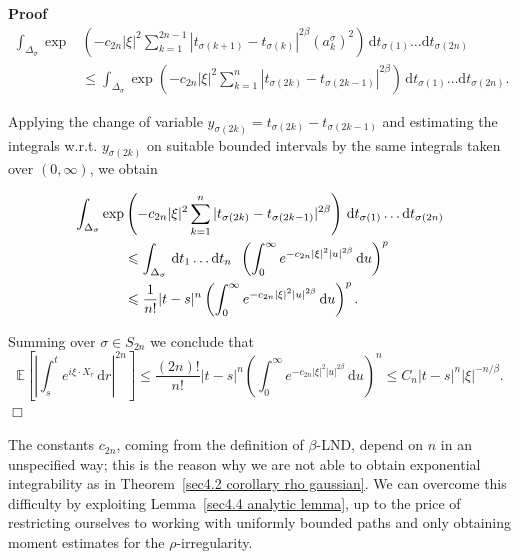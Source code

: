 \documentclass[10pt]{article}
\newcommand{\mathd}{\mathrm{d}}
\newenvironment{proof}{\noindent\textbf{Proof\ }}{\hspace*{\fill}$\Box$\medskip}
\begin{document}
\begin{proof}
  \begin{align}
    \int_{\Delta_{\sigma}} \exp & \left( - c_{2 n} | \xi |^2 \sum_{k = 1}^{2 n
    - 1} | t_{\sigma (k + 1)} - t_{\sigma (k)} |^{2 \beta} (a_k^{\sigma})^2
    \right) \, \mathd t_{\sigma (1)} \ldots \mathd t_{\sigma (2 n)}\\
    & \leqslant \int_{\Delta_{\sigma}} \exp \left( - c_{2 n} | \xi |^2
    \sum_{k = 1}^n | t_{\sigma (2 k)} - t_{\sigma (2 k - 1)} |^{2 \beta}
    \right) \, \mathd t_{\sigma (1)} \ldots \mathd t_{\sigma (2 n)} .
  \end{align}
  
  Applying the change of variable $y_{\sigma (2 k)} = t_{\sigma (2 k)} -
  t_{\sigma (2 k - 1)}$ and estimating the integrals w.r.t. $y_{\sigma (2 k)}$
  on suitable bounded intervals by the same integrals taken over $(0,
  \infty)$, we obtain
  
  \begin{align}
    \int_{\Delta_{\sigma}} \exp & \left( - c_{2 n} | \xi |^2 \sum_{k = 1}^n |
    t_{\sigma (2 k)} - t_{\sigma (2 k - 1)} |^{2 \beta} \right) \, \mathd
    t_{\sigma (1)} \ldots \mathd t_{\sigma (2 n)}\\
    & \leqslant \int_{\Delta_{\sigma}} \, \mathd t_1 \ldots \mathd t_n
    \hspace{0.5em} \left( \int_0^{\infty} e^{- c_{2 n} | \xi |^2 | u |^{2
    \beta}} \, \mathd u \right)^p\\
    & \leqslant \frac{1}{n!} | t - s |^n \left( \int_0^{\infty} e^{- c_{2 n}
    | \xi |^2 | u |^{2 \beta}} \, \mathd u \right)^p .
  \end{align}
  
  Summing over $\sigma \in S_{2 n}$ we conclude that
  \[ \mathbb{E} \left[ \left| \int_s^t e^{i \xi \cdot X_r} \, \mathd r
     \right|^{2 n} \right] \leqslant \frac{(2 n) !}{n!}  | t - s |^n \left(
     \int_0^{\infty} e^{- c_{2 n} | \xi |^2 | u |^{2 \beta}} \, \mathd u
     \right)^n \leqslant C_n | t - s |^n  | \xi |^{- n / \beta} . \]
\end{proof}

\begin{remark}
  The constants $c_{2 n}$, coming from the definition of $\beta$\mbox{-}LND,
  depend on $n$ in an unspecified way; this is the reason why we are not able
  to obtain exponential integrability as in Theorem~\ref{sec4.2 corollary rho
  gaussian}. We can overcome this difficulty by exploiting Lemma~\ref{sec4.4
  analytic lemma}, up to the price of restricting ourselves to working with
  uniformly bounded paths and only obtaining moment estimates for the
  $\rho$\mbox{-}irregularity.
\end{remark}
\end{document}
